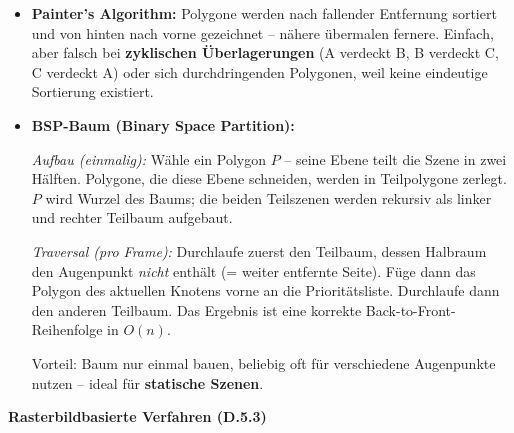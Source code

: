 \documentclass[12pt, a4paper]{article}
\begin{document}
\begin{itemize}
  \item \textbf{Painter's Algorithm:} Polygone werden nach fallender Entfernung sortiert und von hinten nach vorne gezeichnet -- nähere übermalen fernere. Einfach, aber falsch bei \textbf{zyklischen Überlagerungen} (A verdeckt B, B verdeckt C, C verdeckt A) oder sich durchdringenden Polygonen, weil keine eindeutige Sortierung existiert.

  \item \textbf{BSP-Baum (Binary Space Partition):}

  \textit{Aufbau (einmalig):} Wähle ein Polygon $P$ -- seine Ebene teilt die Szene in zwei Hälften. Polygone, die diese Ebene schneiden, werden in Teilpolygone zerlegt. $P$ wird Wurzel des Baums; die beiden Teilszenen werden rekursiv als linker und rechter Teilbaum aufgebaut.

  \textit{Traversal (pro Frame):} Durchlaufe zuerst den Teilbaum, dessen Halbraum den Augenpunkt \textit{nicht} enthält (= weiter entfernte Seite). Füge dann das Polygon des aktuellen Knotens vorne an die Prioritätsliste. Durchlaufe dann den anderen Teilbaum. Das Ergebnis ist eine korrekte Back-to-Front-Reihenfolge in $O(n)$.

  Vorteil: Baum nur einmal bauen, beliebig oft für verschiedene Augenpunkte nutzen -- ideal für \textbf{statische Szenen}.
\end{itemize}

\textbf{Rasterbildbasierte Verfahren (D.5.3)}
\end{document}
